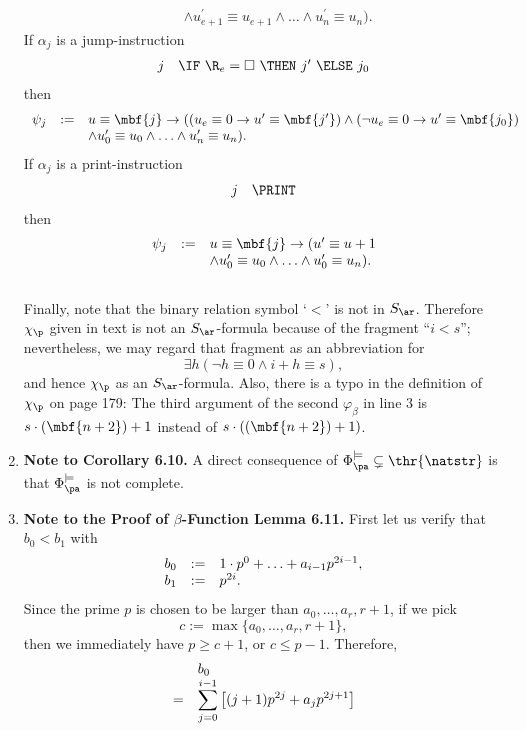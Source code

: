 \begin{enumerate}[1.]
\[\begin{array}{lll}
\ & \ & \land u^\prime_{e + 1} \equiv u_{e + 1} \land \ldots \land u^\prime_n \equiv u_n).
\end{array}
\]
If $\alpha_j$ is a jump-instruction
\[
\begin{array}{ll}
j & \IF \ \R_e = \Box \ \THEN \ j^\prime \ \ELSE \ j_0
\end{array}
\]
then
\[
\begin{array}{lll}
\psi_j & := & u \equiv \mbf{j} \rightarrow ((u_e \equiv 0 \rightarrow u^\prime \equiv \mbf{j^\prime}) \land (\neg u_e \equiv 0 \rightarrow u^\prime \equiv \mbf{j_0}) \cr
\ & \ & \land u^\prime_0 \equiv u_0 \land \ldots \land u^\prime_n \equiv u_n).
\end{array}
\]
If $\alpha_j$ is a print-instruction
\[
\begin{array}{ll}
j & \PRINT
\end{array}
\]
then
\[
\begin{array}{lll}
\psi_j & := & u \equiv \mbf{j} \rightarrow (u^\prime \equiv u + 1 \cr
\ & \ & \land u_0^\prime \equiv u_0 \land \ldots \land u^\prime_0 \equiv u_n).
\end{array}
\]
\ \\
Finally, note that the binary relation symbol `$<$' is not in $S_\ar$. Therefore $\chi_\p$ given in text is not an $S_\ar$-formula because of the fragment ``$i < s$''; nevertheless, we may regard that fragment as an abbreviation for
\[
\exists h (\neg h \equiv 0 \land i + h \equiv s),
\]
and hence $\chi_\p$ as an $S_\ar$-formula. Also, there is a typo in the definition of $\chi_\p$ on page 179: The third argument of the second $\varphi_\beta$ in line 3 is $s \cdot (\mbf{n + 2}) + 1$ instead of $s \cdot ((\mbf{n + 2}) + 1)$.
%
\item \textbf{Note to Corollary 6.10.} A direct consequence of $\Phi_\pa^{\models} \subsetneq \thr{\natstr}$ is that $\Phi_\pa^{\models}$ is not complete.
%
\item \textbf{Note to the Proof of $\beta$-Function Lemma 6.11.} First let us verify that $b_0 < b_1$ with
\[
\begin{array}{lll}
b_0 & := & 1 \cdot p^0 + \ldots + a_{i - 1} p^{2i - 1}, \cr
b_1 & := & p^{2i}.
\end{array}
\]
Since the prime $p$ is chosen to be larger than $a_0, \ldots, a_r, r + 1$, if we pick
\[
c := \max \{ a_0, \ldots, a_r, r + 1 \},
\]
then we immediately have $p \geq c + 1$, or $c \leq p - 1$. Therefore,
\[
\begin{array}{ll}
\    & b_0 \cr
=    & \displaystyle \sum_{j = 0}^{i - 1} \left[ (j + 1)p^{2j} + a_j p^{2j + 1} \right] \cr

\end{array}\]
\end{enumerate}

